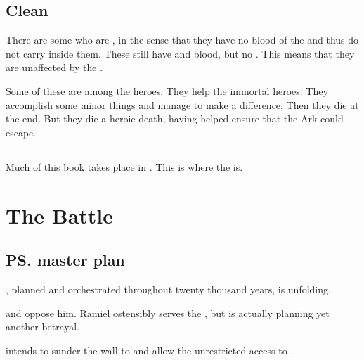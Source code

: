 \subsection{Clean \humans}
There are some \humans who are , in the sense that they have no blood of the  and thus do not carry \Lithrim inside them. 
These \humans still have \bane and \resphan blood, but no \Lithrim.
This means that they are unaffected by the . 

Some of these \humans are among the heroes. 
They help the immortal heroes.
They accomplish some minor things and manage to make a difference. 
Then they die at the end.
But they die a heroic death, having helped ensure that the Ark could escape. 









\subsection{\Neevrai}
Much of this book takes place in . 
This is where the  is. 

















\section{The \Matrices Battle}









\subsection{\ps{\Daggerrain} master plan}
, planned and orchestrated throughout twenty thousand years, is unfolding. 

\Secherdamon{} and \Ishnaruchaefir{} oppose him. Ramiel ostensibly serves the \banes, but is actually planning yet another betrayal.

\Daggerrain{} intends to sunder the wall to \Erebos{} and allow the \Voidbringer{} unrestricted access to \Miith{}. 


